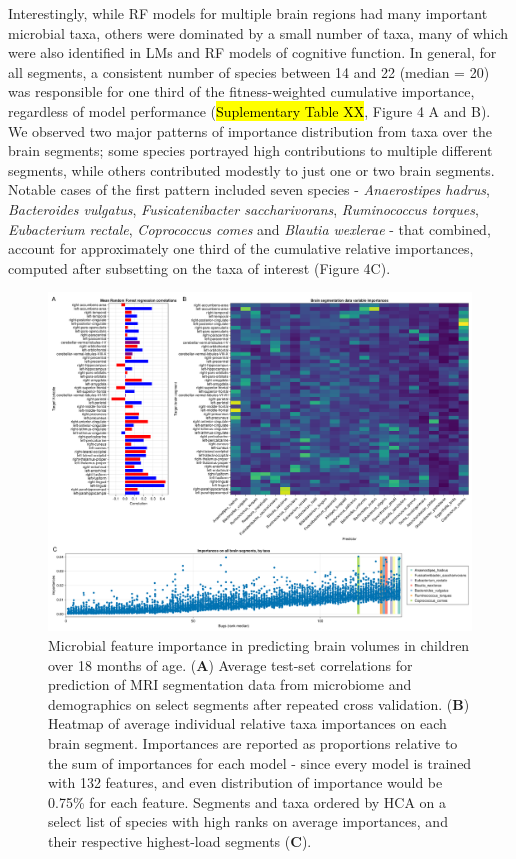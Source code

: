 \documentclass{article}
\begin{document}
Interestingly, while RF models for
multiple brain regions had many important microbial taxa, others were
dominated by a small number of taxa, many of which
were also identified in LMs and RF models of cognitive function. 
In general, for all segments, a
consistent number of species between 14 and 22 (median = 20) was
responsible for one third of the fitness-weighted cumulative importance,
regardless of model performance (\hl{Suplementary Table XX}, Figure 4 A and B).
We observed two major patterns of importance distribution from
taxa over the brain segments; some species portrayed high contributions
to multiple different segments, while others contributed modestly to
just one or two brain segments. Notable cases of the first pattern
included seven species - \emph{Anaerostipes hadrus}, \emph{Bacteroides
vulgatus}, \emph{Fusicatenibacter saccharivorans}, \emph{Ruminococcus
torques}, \emph{Eubacterium rectale}, \emph{Coprococcus comes} and
\emph{Blautia wexlerae} - that combined, account for approximately one
third of the cumulative relative importances, computed after subsetting
on the taxa of interest (Figure 4C).

\begin{figure}
    \centering
    \includegraphics[width=\textwidth]{assets/Figure4.png}
    \caption{
        Microbial feature importance in predicting brain volumes in children over 18 months of age.
        (\textbf{A}) Average test-set correlations for prediction of MRI segmentation
        data from microbiome and demographics on select segments after repeated
        cross validation. (\textbf{B}) Heatmap of average individual relative taxa
        importances on each brain segment. Importances are reported as
        proportions relative to the sum of importances for each model - since
        every model is trained with 132 features, and even distribution of
        importance would be 0.75\% for each feature. Segments and taxa ordered
        by HCA on a select list of species with high ranks on average importances,
        and their respective highest-load segments (\textbf{C}).
    }
    \label{fig:4}
\end{figure}
\end{document}
